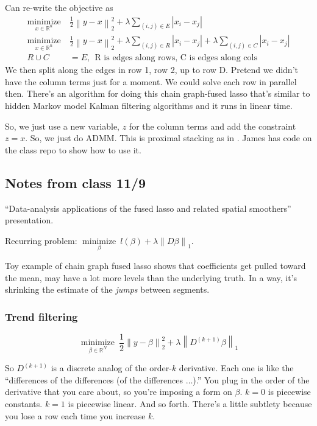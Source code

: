 \documentclass{article}
\newcommand{\op}[2]{{\ensuremath{\underset{ #2 }{\operatorname{ #1 }}~}}}
\newcommand{\norm}[1]{{ \ensuremath{ \left\lVert  #1 \right\rVert  }  }}
\begin{document}
Can re-write the objective as
\begin{align*}
\op{minimize}{x\in\mathbb{R}^n} &\frac{1}{2}\norm{y-x}_2^2+\lambda \sum_{(i,j)\in E} |x_i-x_j|\\
\op{minimize}{x\in\mathbb{R}^n} &\frac{1}{2}\norm{y-x}_2^2+\lambda \sum_{(i,j)\in R} |x_i-x_j|+\lambda \sum_{(i,j)\in C} |x_i-x_j|\\
R\cup C &= E, ~~\textrm{R is edges along rows, C is edges along cols}
\end{align*}
We then split along the edges in row 1, row 2, up to row D. Pretend we didn't have the column terms just for a moment.
We could solve each row in parallel then. There's an algorithm for doing this chain graph-fused lasso that's similar
to hidden Markov model Kalman filtering algorithms and it runs in linear time.

So, we just use a new variable, $z$ for the column terms and add the constraint $z=x$. So, we just do ADMM.
This is proximal stacking as in \cite{barbero2014modular}. James has code on the class repo to show how to use it.





\subsection{Notes from class 11/9}
``Data-analysis applications of the fused lasso and related spatial smoothers'' presentation.

Recurring problem: $\op{minimize}{\beta} l(\beta)+\lambda \norm{D\beta}_1$.

Toy example of chain graph fused lasso shows that coefficients get pulled toward the mean, may have a lot more levels than the underlying truth. In a way, it's shrinking the estimate of the \emph{jumps} between segments.

\subsubsection{Trend filtering}

$$\op{minimize}{\beta \in \mathbb{R}^N} \frac12 \norm{y-\beta}_2^2+\lambda \norm{D^{(k+1)}\beta}_1$$

So $D^{(k+1)}$ is a discrete analog of the order-$k$ derivative. Each one is like the ``differences of the differences (of the differences $\ldots$).'' You plug in the order of the derivative that you care about, so you're imposing a form on $\beta$. $k=0$ is piecewise constants. $k=1$ is piecewise linear. And so forth. There's a little subtlety because you lose a row each time you increase $k$.
\end{document}
